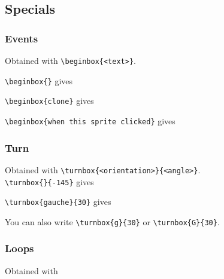 \documentclass[a4paper,11pt]{article}
\begin{document}
\subsection{Specials}

\subsubsection{Events}%
Obtained with \texttt{\textbackslash beginbox\{<text>\}}.

\texttt{\textbackslash beginbox\{\}} gives \parbox{1ex}{\begin{Scratch}\beginbox{}\end{Scratch}}

\texttt{\textbackslash beginbox\{clone\}} gives \parbox{1ex}{\begin{Scratch}\end{Scratch}}

\texttt{\textbackslash beginbox\{when this sprite clicked\}} gives

\hfill\parbox{6cm}{\begin{Scratch}\end{Scratch}}

\subsubsection{Turn}%
Obtained with \texttt{\textbackslash turnbox\{<orientation>\}\{<angle>\}}.\\

\texttt{\textbackslash turnbox\{\}\{-145\}} gives 

\texttt{\textbackslash turnbox\{gauche\}\{30\}} gives 

You can also write \texttt{\textbackslash turnbox\{g\}\{30\}} or \texttt{\textbackslash turnbox\{G\}\{30\}}.

\subsubsection{Loops}%
Obtained with
\end{document}
